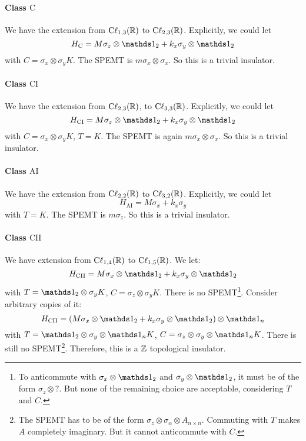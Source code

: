 \paragraph{Class $\mathrm{C}$} We have the extension from
$\mathrm{C\ell}_{1,3}(\mathbb{R})$ to $\mathrm{C\ell}_{2,3}(\mathbb{R})$. Explicitly, we
could let
\begin{equation}
    H_{\mathrm{C}} = M\sigma_z\otimes\id_2 + k_x\sigma_y\otimes\id_2
\end{equation}
with $C=\sigma_x\otimes\sigma_y K$. The SPEMT is $m\sigma_x\otimes\sigma_x$. So
this is a trivial insulator.

\paragraph{Class $\mathrm{CI}$} We have the extension from
$\mathrm{C\ell}_{2,3}(\mathbb{R})$, to $\mathrm{C\ell}_{3,3}(\mathbb{R})$. Explicitly, we
could let
\begin{equation}
    H_{\mathrm{CI}} = M\sigma_z\otimes\id_2 + k_x\sigma_y\otimes\id_2
\end{equation}
with $C=\sigma_x\otimes\sigma_y K$, $T=K$. The SPEMT is again
$m\sigma_x\otimes\sigma_x$. So this is a trivial insulator.

\paragraph{Class $\mathrm{AI}$} We have the extension from
$\mathrm{C\ell}_{2,2}(\mathbb{R})$ to $\mathrm{C\ell}_{3,2}(\mathbb{R})$. Explicitly, we could let
\begin{equation}
    H_{\mathrm{AI}} = M\sigma_x + k_x\sigma_y
\end{equation}
with $T=K$. The SPEMT is $m\sigma_z$. So this is a trivial insulator.

\paragraph{Class $\mathrm{CII}$} We have extension from
$\mathrm{C\ell}_{1,4}(\mathbb{R})$ to $\mathrm{C\ell}_{1,5}(\mathbb{R})$.
We let:
\begin{equation}
    H_{\mathrm{CII}} = M\sigma_x\otimes\id_2 + k_x\sigma_y\otimes\id_2
\end{equation}
with $T=\id_2\otimes\sigma_y K$, $C=\sigma_z\otimes\sigma_y K$. There is no
SPEMT\footnote{To anticommute with $\sigma_x\otimes\id_2$ and
$\sigma_y\otimes\id_2$, it must be of the form $\sigma_z\otimes?$. But none of
the remaining choice are acceptable, considering $T$ and $C$.}. Consider
arbitrary copies of it:
\begin{equation}
    H_{\mathrm{CII}} = (M\sigma_x\otimes\id_2 +
    k_x\sigma_y\otimes\id_2)\otimes\id_n
\end{equation}
with $T=\id_2\otimes\sigma_y\otimes\id_n K$,
$C=\sigma_z\otimes\sigma_y\otimes\id_n K$. There is still no SPEMT\footnote{The
SPEMT has to be of the form $\sigma_z\otimes\sigma_\alpha\otimes A_{n\times n}$.
Commuting with $T$ makes $A$ completely imaginary. But it cannot anticommute
with $C$.}. Therefore, this is a $\mathbb{Z}$ topological insulator.

